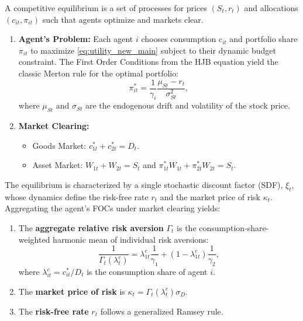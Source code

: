 \begin{proposition}
A competitive equilibrium is a set of processes for prices \((S_t, r_t)\) and allocations \((c_{it}, \pi_{it})\) such that agents optimize and markets clear.
\begin{enumerate}
    \item \textbf{Agent's Problem:} Each agent \(i\) chooses consumption \(c_{it}\) and portfolio share \(\pi_{it}\) to maximize \eqref{eq:utility_new_main} subject to their dynamic budget constraint. The First Order Conditions from the HJB equation yield the classic Merton rule for the optimal portfolio:
        \begin{equation}\label{eq:merton_rule_new_main}
        \pi_{it}^* = \frac{1}{\gamma_i} \frac{\mu_{St}-r_t}{\sigma_{St}^2},
        \end{equation}
        where \(\mu_{St}\) and \(\sigma_{St}\) are the endogenous drift and volatility of the stock price.
    \item \textbf{Market Clearing:}
        \begin{itemize}
            \item Goods Market: \(c_{1t}^* + c_{2t}^* = D_t\).
            \item Asset Market: \(W_{1t} + W_{2t} = S_t\) and \(\pi_{1t}^* W_{1t} + \pi_{2t}^* W_{2t} = S_t\).
        \end{itemize}
\end{enumerate}
\end{proposition}

\begin{proposition}
The equilibrium is characterized by a single stochastic discount factor (SDF), \(\xi_t\), whose dynamics define the risk-free rate \(r_t\) and the market price of risk \(\kappa_t\). Aggregating the agent's FOCs under market clearing yields:
\begin{enumerate}
    \item The \textbf{aggregate relative risk aversion} \(\Gamma_t\) is the consumption-share-weighted harmonic mean of individual risk aversions:
        \begin{equation}\label{eq:gamma_agg_harmonic_new_main}
        \frac{1}{\Gamma_t(\lambda^c_t)} = \lambda^c_{1t}\frac{1}{\gamma_1} + (1-\lambda^c_{1t})\frac{1}{\gamma_2},
        \end{equation}
        where \(\lambda^c_{it} = c_{it}^*/D_t\) is the consumption share of agent \(i\).
    \item The \textbf{market price of risk} is \(\kappa_t = \Gamma_t(\lambda^c_t) \sigma_D\).
    \item The \textbf{risk-free rate} \(r_t\) follows a generalized Ramsey rule.
\end{enumerate}
\end{proposition}

